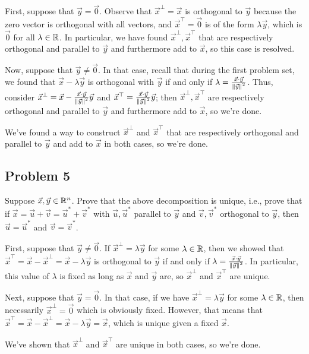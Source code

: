 \documentclass[main.tex]{subfiles}
\begin{document}
\begin{soln}
     First, suppose that $\vec{y} = \vec{0}$. Observe that $\vec{x}^\perp = \vec{x}$ is orthogonal to $\vec{y}$ because the zero vector is orthogonal with all vectors, and $\vec{x}^\top = \vec{0}$ is of the form $\lambda\vec{y}$, which is $\vec{0}$ for all $\lambda\in \mathbb R$. In particular, we have found $\vec{x}^\perp, \vec{x}^\top$ that are respectively orthogonal and parallel to $\vec{y}$ and furthermore add to $\vec{x}$, so this case is resolved.

     Now, suppose that $\vec{y} \neq \vec{0}$. In that case, recall that during the first problem set, we found that $\vec{x} - \lambda \vec{y}$ is orthogonal with $\vec{y}$ if and only if $\lambda = \frac{\vec{x} \cdot \vec{y}}{\left\lVert \vec{y} \right\rVert^2}$. Thus, consider $\vec{x}^\perp = \vec{x} - \frac{\vec{x} \cdot \vec{y}}{\left\lVert \vec{y} \right\rVert^2}\vec{y}$ and $\vec{x}^\top = \frac{\vec{x} \cdot \vec{y}}{\left\lVert \vec{y} \right\rVert^2}\vec{y}$; then $\vec{x}^\perp, \vec{x}^\top$ are respectively orthogonal and parallel to $\vec{y}$ and furthermore add to $\vec{x}$, so we're done.

     We've found a way to construct $\vec{x}^\perp$ and $\vec{x}^\top$ that are respectively orthogonal and parallel to $\vec{y}$ and add to $\vec{x}$ in both cases, so we're done.
\end{soln}
\eject

\subsection{Problem 5}
\begin{claim}
    Suppose $\vec{x}, \vec{y} \in \mathbb R^n$. Prove that the above decomposition is unique, i.e., prove that if $\vec{x} = \vec{u} + \vec{v} = \vec{u}^* + \vec{v}^*$ with $\vec{u}, \vec{u}^*$ parallel to $\vec{y}$ and $\vec{v}, \vec{v}^*$ orthogonal to $\vec{y}$, then $\vec{u} = \vec{u}^*$ and $\vec{v} = \vec{v}^*$.
\end{claim}

\begin{soln}
    First, suppose that $\vec{y} \neq \vec{0}$. If $\vec{x}^\perp = \lambda \vec{y}$ for some $\lambda\in \mathbb R$, then we showed that $\vec{x}^\top = \vec{x} - \vec{x}^\perp = \vec{x} - \lambda\vec{y}$ is orthogonal to $\vec{y}$ if and only if $\lambda = \frac{\vec{x} \cdot \vec{y}}{\left\lVert \vec{y} \right\rVert^2}$. In particular, this value of $\lambda$ is fixed as long as $\vec{x}$ and $\vec{y}$ are, so $\vec{x}^\perp$ and $\vec{x}^\top$ are unique.

    Next, suppose that $\vec{y} = \vec{0}$. In that case, if we have $\vec{x}^\perp = \lambda \vec{y}$ for some $\lambda\in \mathbb R$, then necessarily $\vec{x}^\perp = \vec{0}$ which is obviously fixed. However, that means that $\vec{x}^\top = \vec{x} - \vec{x}^\perp = \vec{x} - \lambda\vec{y} = \vec{x}$, which is unique given a fixed $\vec{x}$.
    
    We've shown that $\vec{x}^\perp$ and $\vec{x}^\top$ are unique in both cases, so we're done.
\end{soln}
\eject
\end{document}
